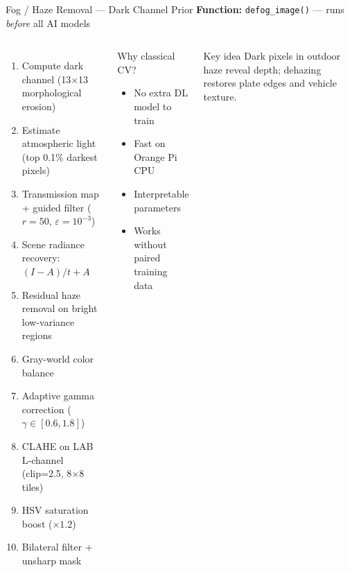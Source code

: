 \documentclass[aspectratio=169,11pt]{beamer}
\begin{document}
\begin{frame}{Fog / Haze Removal --- Dark Channel Prior}
  \textbf{Function:} \texttt{defog\_image()} --- runs \emph{before} all AI models
  \begin{columns}[T]
    \small
    \begin{enumerate}
      \item Compute dark channel (13$\times$13 morphological erosion)
      \item Estimate atmospheric light (top 0.1\% darkest pixels)
      \item Transmission map + guided filter ($r{=}50$, $\varepsilon{=}10^{-3}$)
      \item Scene radiance recovery: $(I - A) / t + A$
      \item Residual haze removal on bright low-variance regions
      \item Gray-world color balance
      \item Adaptive gamma correction ($\gamma \in [0.6, 1.8]$)
      \item CLAHE on LAB L-channel (clip=2.5, 8$\times$8 tiles)
      \item HSV saturation boost ($\times 1.2$)
      \item Bilateral filter + unsharp mask
    \end{enumerate}
    \begin{block}{Why classical CV?}
      \begin{itemize}
        \item No extra DL model to train
        \item Fast on Orange Pi CPU
        \item Interpretable parameters
        \item Works without paired training data
      \end{itemize}
    \end{block}
    \begin{alertblock}{Key idea}
      Dark pixels in outdoor haze reveal depth; dehazing restores plate edges and vehicle texture.
    \end{alertblock}
  \end{columns}
\end{frame}
\end{document}
